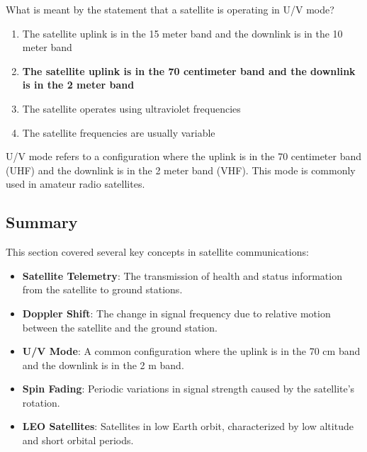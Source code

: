 \begin{tcolorbox}[colback=gray!10!white,colframe=black!75!black,title={T8B08}]
    What is meant by the statement that a satellite is operating in U/V mode?
    \begin{enumerate}[label=\Alph*),noitemsep]
        \item The satellite uplink is in the 15 meter band and the downlink is in the 10 meter band
        \item \textbf{The satellite uplink is in the 70 centimeter band and the downlink is in the 2 meter band}
        \item The satellite operates using ultraviolet frequencies
        \item The satellite frequencies are usually variable
    \end{enumerate}
\end{tcolorbox}
U/V mode refers to a configuration where the uplink is in the 70 centimeter band (UHF) and the downlink is in the 2 meter band (VHF). This mode is commonly used in amateur radio satellites.


\subsection*{Summary}
This section covered several key concepts in satellite communications:
\begin{itemize}
    \item \textbf{Satellite Telemetry}: The transmission of health and status information from the satellite to ground stations.
    \item \textbf{Doppler Shift}: The change in signal frequency due to relative motion between the satellite and the ground station.
    \item \textbf{U/V Mode}: A common configuration where the uplink is in the 70 cm band and the downlink is in the 2 m band.
    \item \textbf{Spin Fading}: Periodic variations in signal strength caused by the satellite's rotation.
    \item \textbf{LEO Satellites}: Satellites in low Earth orbit, characterized by low altitude and short orbital periods.
\end{itemize}
